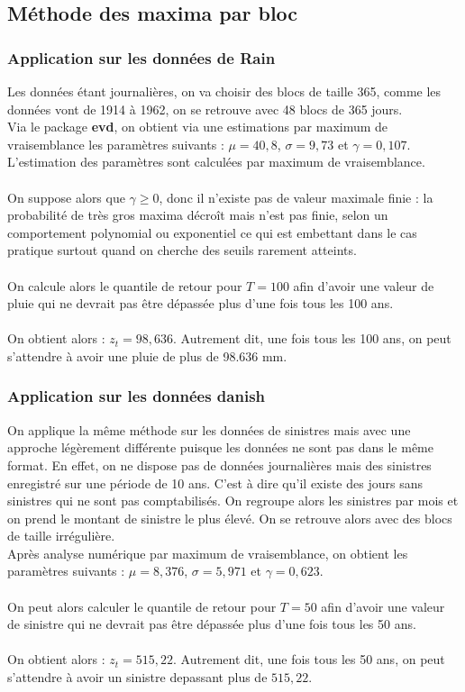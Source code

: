 \documentclass{article}
\theoremstyle{plain}
\theoremstyle{definition}
\theoremstyle{plain}
\begin{document}
\subsection{Méthode des maxima par bloc}

\subsubsection{Application sur les données de Rain}

Les données étant journalières, on va choisir des blocs de taille 365, comme les données vont de 1914 à 1962, on se retrouve avec 48 blocs de 365 jours.
\\
Via le package \textbf{evd}, on obtient via une estimations par maximum de vraisemblance les paramètres suivants : $\mu = 40,8$, $\sigma = 9,73$ et $\gamma = 0,107$.
\\
L'estimation des paramètres sont calculées par maximum de vraisemblance.
\\
\\
On suppose alors que $\gamma \geq 0$, donc il n’existe pas de valeur maximale finie : la probabilité de très gros maxima décroît mais n'est pas finie, selon un comportement polynomial ou exponentiel ce qui est embettant dans le cas pratique surtout quand on cherche des seuils rarement atteints.
\\
\\
On calcule alors le quantile de retour pour $T=100$ afin d'avoir une valeur de pluie qui ne devrait pas être dépassée plus d'une fois tous les 100 ans.
\\
\\
On obtient alors : $z_t = 98,636$. Autrement dit, une fois tous les 100 ans, on peut s'attendre à avoir une pluie de plus de 98.636 mm.




\subsubsection{Application sur les données danish}
On applique la même méthode sur les données de sinistres mais avec une approche légèrement différente puisque les données ne sont pas dans le même format. En effet, on ne dispose pas de données journalières mais des sinistres enregistré sur une période de 10 ans. C'est à dire qu'il existe des jours sans sinistres qui ne sont pas comptabilisés.
On regroupe alors les sinistres par mois et on prend le montant de sinistre le plus élevé. On se retrouve alors avec des blocs de taille irrégulière.
\\
Après analyse numérique par maximum de vraisemblance, on obtient les paramètres suivants : $\mu = 8,376$, $\sigma = 5,971$ et $\gamma = 0,623$.
\\
\\
On peut alors calculer le quantile de retour pour $T=50$ afin d'avoir une valeur de sinistre qui ne devrait pas être dépassée plus d'une fois tous les 50 ans.
\\
\\
On obtient alors : $z_t = 515,22$. Autrement dit, une fois tous les 50 ans, on peut s'attendre à avoir un sinistre depassant plus de $515,22$.
\end{document}
